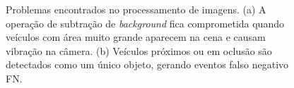 \begin{figure}[ht]
\begin{center}
\begin{subfigure}[b]{.49\textwidth}
\begin{center}
      \end{center}
      \caption{}
      \label{fig:problema_veiculo_junto}
    \end{subfigure}
  \end{center}
  \caption{Problemas encontrados no processamento de imagens. (a) A operação de subtração de \textit{background} fica comprometida quando veículos com área muito grande aparecem na cena e causam vibração na câmera. (b) Veículos próximos ou em oclusão são detectados como um único objeto, gerando eventos falso negativo FN.}
  \label{fig:problemas}
\end{figure}






